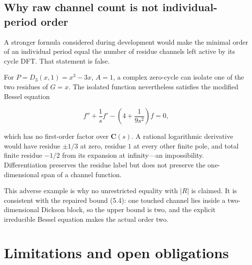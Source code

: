 \documentclass[
  11pt,
  a4paper,
]{amsart}
\begin{document}
\subsection{Why raw channel count is not individual-period order}

A stronger formula considered during development would make the minimal
order of an individual period equal the number of residue channels left
active by its cycle DFT. That statement is false.

For \(P=D_3(x,1)=x^3-3x\), \(A=1\), a complex zero-cycle can isolate one
of the two residues of \(G=x\). The isolated function nevertheless
satisfies the modified Bessel equation

\[
f''+\frac1sf'-\left(4+\frac{1}{9s^2}\right)f=0,
\]

which has no first-order factor over \(\mathbf C(s)\). A rational
logarithmic derivative would have residue \(\pm1/3\) at zero, residue
\(1\) at every other finite pole, and total finite residue \(-1/2\) from
its expansion at infinity---an impossibility. Differentiation preserves
the residue label but does not preserve the one-dimensional span of a
channel function.

This adverse example is why no unrestricted equality with \(|R|\) is
claimed. It is consistent with the repaired bound (5.4): one touched
channel lies inside a two-dimensional Dickson block, so the upper bound
is two, and the explicit irreducible Bessel equation makes the actual
order two.

\section{Limitations and open obligations}
\end{document}
